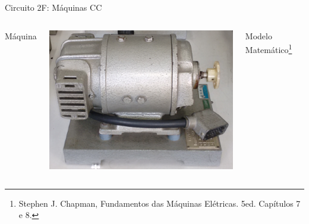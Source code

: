 \begin{frame}{Circuito 2F: Máquinas CC}
\centering


\begin{columns}

\centering
Máquina
\vspace*{0.5cm}

\includegraphics[width=0.95\linewidth]{./figuras/Segundo-Circuito/maquina_CC_b}

\centering
Modelo Matemático\footnote[frame]{\tiny Stephen J. Chapman, Fundamentos das Máquinas Elétricas. 5ed. Capítulos 7 e 8.}
\vspace*{1cm}


\end{columns}
\end{frame}
